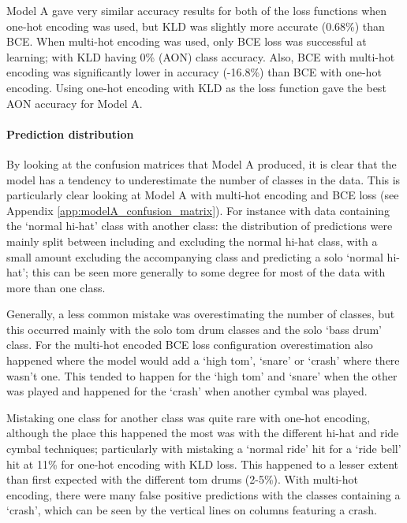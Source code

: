 \documentclass[12pt]{article}
\begin{document}
	Model A gave very similar accuracy results for both of the loss functions when one-hot encoding was used, but KLD was slightly more accurate (0.68\%) than BCE. When multi-hot encoding was used, only BCE loss was successful at learning; with KLD having 0\% (AON) class accuracy. Also, BCE with multi-hot encoding was significantly lower in accuracy (-16.8\%) than BCE with one-hot encoding. Using one-hot encoding with KLD as the loss function gave the best AON accuracy for Model A.\medskip
	
	\paragraph*{Prediction distribution}
	
	By looking at the confusion matrices that Model A produced, it is clear that the model has a tendency to underestimate the number of classes in the data. This is particularly clear looking at Model A with multi-hot encoding and BCE loss (see Appendix \ref{app:modelA_confusion_matrix}). For instance with data containing the `normal hi-hat' class with another class: the distribution of predictions were mainly split between including and excluding the normal hi-hat class, with a small amount excluding the accompanying class and predicting a solo `normal hi-hat'; this can be seen more generally to some degree for most of the data with more than one class.\medskip
	
	Generally, a less common mistake was overestimating the number of classes, but this occurred mainly with the solo tom drum classes and the solo `bass drum' class. For the multi-hot encoded BCE loss configuration overestimation also happened where the model would add a `high tom', `snare' or `crash' where there wasn't one. This tended to happen for the `high tom' and `snare' when the other was played and happened for the `crash' when another cymbal was played.\medskip
	
	Mistaking one class for another class was quite rare with one-hot encoding, although the place this happened the most was with the different hi-hat and ride cymbal techniques; particularly with mistaking a `normal ride' hit for a `ride bell' hit at 11\% for one-hot encoding with KLD loss. This happened to a lesser extent than first expected with the different tom drums (2-5\%). With multi-hot encoding, there were many false positive predictions with the classes containing a `crash', which can be seen by the vertical lines on columns featuring a crash.\medskip
	
\end{document}
